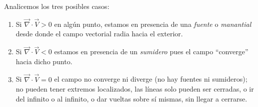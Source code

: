 Analicemos los tres posibles casos:

\begin{enumerate}
\item Si $\vec{\nabla} \cdot \vec{V} >0$ en algún punto, estamos en presencia de una \textit{fuente} o \textit{manantial} desde donde el campo vectorial radia hacia el exterior. 

\item Si $\vec{\nabla} \cdot \vec{V} < 0$ estamos en presencia de un \textit{sumidero} pues el campo “converge” hacia dicho  punto.

\item  Si $\vec{\nabla} \cdot \vec{V} =0$ el campo no converge ni diverge (no hay fuentes ni sumideros); no pueden tener extremos localizados, las líneas solo pueden ser cerradas, o ir del infinito o al infinito, o dar vueltas sobre sí mismas, sin llegar a cerrarse.
\end{enumerate}

